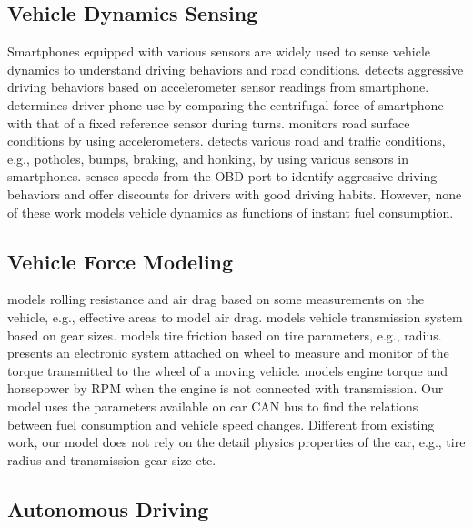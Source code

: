 \subsection{Vehicle Dynamics Sensing}

Smartphones equipped with various sensors are widely used
to sense vehicle dynamics to understand driving behaviors and road conditions.
\cite{johnson2011driving} detects aggressive driving behaviors 
based on accelerometer sensor readings from smartphone. 
\cite{wang2013sensing} determines driver phone use by comparing
the centrifugal force of smartphone with that of a fixed reference sensor
during turns. 
\cite{eriksson2008pothole} monitors road surface conditions by using accelerometers. 
\cite{Mohan2008Nericell} detects various road and traffic conditions, 
e.g., potholes, bumps, braking, and honking, 
by using various sensors in smartphones. 
\cite{progressive} senses speeds from the OBD port to identify aggressive
driving behaviors and offer discounts for drivers with good driving habits.  
However, none of these work models vehicle dynamics as functions of instant fuel consumption. 

\subsection{Vehicle Force Modeling}

\cite{andersson2012online} models rolling resistance and air drag based on some measurements 
on the vehicle, e.g., effective areas to model air drag. 
\cite{zanasi2001dynamic} models vehicle transmission system based on gear sizes. 
\cite{canudas1999dynamic} models tire friction based on tire parameters, e.g., radius. 
\cite{brusamarello2010dynamic} presents an electronic system attached on wheel to measure and
monitor of the torque transmitted to the wheel of a moving vehicle.
\cite{vong2006prediction} models engine torque and horsepower by RPM when the
engine is not connected with transmission. 
Our model uses the parameters available on car CAN bus to find the relations between fuel consumption and vehicle speed changes.
Different from existing work, 
our model does not rely on the detail physics properties of the car, 
e.g., tire radius and transmission gear size etc.


\subsection{Autonomous Driving}


